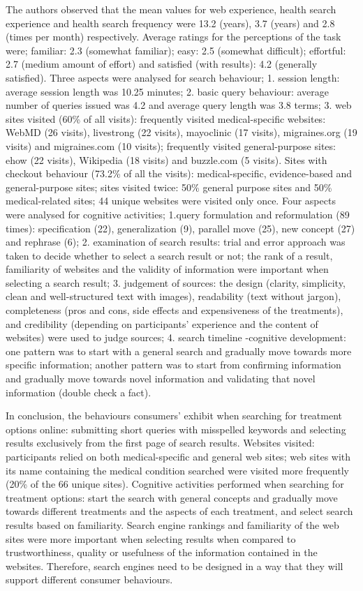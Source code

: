 \documentclass[]{article}
\begin{document}
The authors observed that the mean values for web experience, health search experience and health search frequency were 13.2 (years), 3.7 (years) and 2.8 (times per month) respectively. Average ratings for the perceptions of the task were; familiar: 2.3 (somewhat familiar); easy: 2.5 (somewhat difficult); effortful: 2.7 (medium amount of effort) and satisfied (with results): 4.2 (generally satisfied). Three aspects were analysed for search behaviour; 1. session length: average session length was 10.25 minutes; 2. basic query behaviour: average number of queries issued was 4.2 and average query length was 3.8 terms; 3. web sites visited (60\% of all visits): frequently visited medical-specific websites: WebMD (26 visits), livestrong (22 visits), mayoclinic (17 visits), migraines.org (19 visits) and migraines.com (10 visits); frequently visited general-purpose sites:  ehow (22 visits), Wikipedia (18 visits) and buzzle.com (5 visits). Sites with checkout behaviour (73.2\% of all the visits): medical-specific, evidence-based and general-purpose sites; sites visited twice: 50\% general purpose sites and 50\% medical-related sites; 44 unique websites were visited only once. Four aspects were analysed for cognitive activities; 1.query formulation and reformulation (89 times): specification (22), generalization (9), parallel move (25), new concept (27) and rephrase (6); 2. examination of search results: trial and error approach was taken to decide whether to select a search result or not; the rank of a result, familiarity of websites and the validity of information were important when selecting a search result; 3. judgement of sources: the design (clarity, simplicity, clean and well-structured text with images), readability (text without jargon), completeness (pros and cons, side effects and expensiveness of the treatments), and credibility (depending on participants' experience and the content of websites) were used to judge sources; 4. search timeline -cognitive development: one pattern was to start with a general search and gradually move towards more specific information; another pattern was to start from confirming information and gradually move towards novel information and validating that novel information (double check a fact).
      
In conclusion, the behaviours consumers' exhibit when searching for treatment options online:  submitting short queries with misspelled keywords and selecting results exclusively from the first page of search results. Websites visited: participants relied on both medical-specific and general web sites; web sites with its name containing the medical condition searched were visited more frequently (20\% of the 66 unique sites). Cognitive activities performed when searching for treatment options: start the search with general concepts and gradually move towards different treatments and the aspects of each treatment, and select search results based on familiarity. Search engine rankings and familiarity of the web sites were more important when selecting results when compared to trustworthiness, quality or usefulness of the information contained in the websites. Therefore, search engines need to be designed in a way that they will support different consumer behaviours.  
\end{document}

